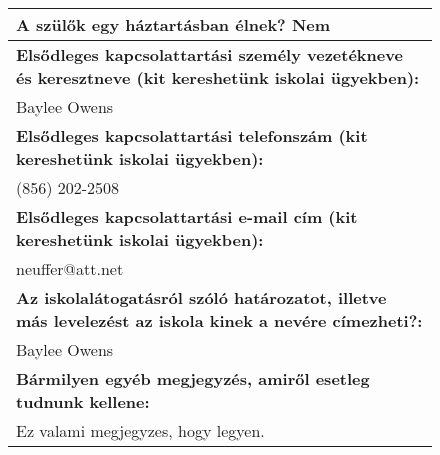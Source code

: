 \documentclass[10pt,a4paper]{article}
\begin{document}
\begin{figure}[!ht]
\begin{tabular}{|m{\textwidth}|}
\hline\vspace{3pt}
\textbf{A szülők egy háztartásban élnek? } \hspace{0.5cm} Nem \vspace{3pt} \\
\hline\vspace{3pt}
\textbf{Elsődleges kapcsolattartási személy vezetékneve és keresztneve (kit kereshetünk iskolai ügyekben):} \\ \hspace{0.5cm} Baylee Owens \vspace{3pt} \\
\hline\vspace{3pt}
\textbf{Elsődleges kapcsolattartási telefonszám (kit kereshetünk iskolai ügyekben):} \\ \hspace{0.5cm} (856) 202-2508 \vspace{3pt} \\
\hline\vspace{3pt}
\textbf{Elsődleges kapcsolattartási e-mail cím (kit kereshetünk iskolai ügyekben):} \\ \hspace{0.5cm} neuffer@att.net \vspace{3pt} \\
\hline\vspace{3pt}
\textbf{Az iskolalátogatásról szóló határozatot, illetve más levelezést az iskola kinek a nevére címezheti?:} \\ \hspace{0.5cm} Baylee Owens \vspace{3pt} \\
\hline\vspace{3pt}
\textbf{Bármilyen egyéb megjegyzés, amiről esetleg tudnunk kellene:} \\ \hspace{0.5cm} Ez valami megjegyzes, hogy legyen. \vspace{3pt} \\


\end{tabular}
\end{figure}
\end{document}
